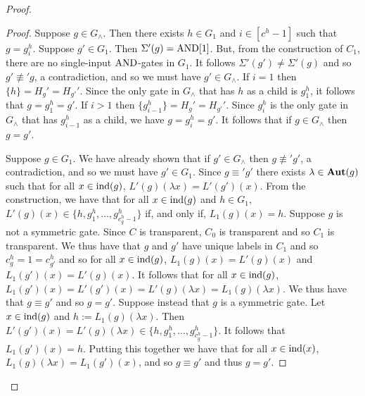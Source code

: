 \documentclass[../paper.tex]{subfiles}
\begin{document}
\begin{proof}
\begin{proof}
    
    Suppose $g \in G_{\land}$. Then there exists $h \in G_1$ and $i \in [c^h -
    1]$ such that $g = g^h_i$. Suppose $g' \in G_1$. Then $\Sigma'(g) =
    \text{\upshape AND}[1]$. But, from the construction of $C_1$, there are no single-input
    $\text{\upshape AND}$-gates in $G_1$. It follows $\Sigma'(g') \neq \Sigma'(g)$ and so $g'
    \not\equiv' g$, a contradiction, and so we must have $g' \in G_{\land}$. If
    $i = 1$ then $\{ h \} = H_g' = H_{g'}'$. Since the only gate in $G_\land$
    that has $h$ as a child is $g^h_1$, it follows that $g = g^h_1 = g'$. If $i
    > 1$ then $\{g^{h}_{i-1}\} = H_g' = H_{g'}'$. Since $g^h_i$ is the only gate
    in $G_\land$ that has $g^h_{i-1}$ as a child, we have $g = g^h_i = g'$. It
    follows that if $g \in G_\land$ then $g = g'$.

    Suppose $g \in G_1$. We have already shown that if $g' \in G_\land$ then $g
    \not\equiv' g'$, a contradiction, and so we must have $g' \in G_1$. Since $g
    \equiv' g'$ there exists $\lambda \in \text{\textbf{Aut}}(g)$ such that for all $x \in
    \text{\upshape ind}(g)$, $L'(g)(\lambda x) = L'(g')(x)$. From the construction, we have
    that for all $x \in \text{\upshape ind}(g)$ and $h \in G_1$, $L'(g)(x) \in \{h, g^h_1 ,
    \ldots, g^h_{c^h_g -1}\}$ if, and only if, $L_1(g)(x) = h$. Suppose $g$ is
    not a symmetric gate. Since $C$ is transparent, $C_0$ is transparent and so
    $C_1$ is transparent. We thus have that $g$ and $g'$ have unique labels in
    $C_1$ and so $c^h_g = 1 = c^h_{g'}$ and so for all $x \in \text{\upshape ind}(g)$,
    $L_1(g)(x) = L'(g)(x)$ and $L_1(g')(x) = L'(g)(x)$. It follows that for all
    $x \in \text{\upshape ind}(g)$, $L_1(g')(x) = L'(g')(x) = L'(g)(\lambda x) = L_1(g)(\lambda
    x)$. We thus have that $g \equiv g'$ and so $g = g'$. Suppose instead that
    $g$ is a symmetric gate. Let $x \in \text{\upshape ind}(g)$ and $h := L_1(g)(\lambda x)$.
    Then $L' (g')(x) = L'(g)(\lambda x) \in \{h, g^h_1, \ldots , g^h_{c^h_g -
      1}\}$. It follows that $L_1(g')(x) = h$. Putting this together we have
    that for all $x \in \text{\upshape ind}(x)$, $L_1(g) (\lambda x) = L_1(g')(x)$, and so $g
    \equiv g'$ and thus $g = g'$.
    


\end{proof}
\end{proof}
\end{document}
